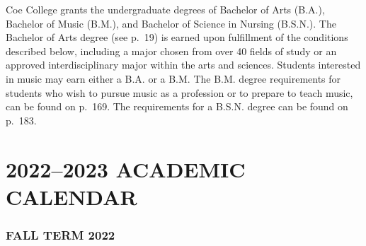 \documentclass[
  letterpaper,
]{scrbook}
\begin{document}
Coe College grants the undergraduate degrees of Bachelor of Arts (B.A.),
Bachelor of Music (B.M.), and Bachelor of Science in Nursing (B.S.N.).
The Bachelor of Arts degree (see p.~19) is earned upon fulfillment of
the conditions described below, including a major chosen from over 40
fields of study or an approved interdisciplinary major within the arts
and sciences. Students interested in music may earn either a B.A. or a
B.M. The B.M. degree requirements for students who wish to pursue music
as a profession or to prepare to teach music, can be found on p.~169.
The requirements for a B.S.N. degree can be found on p.~183.

\hypertarget{academic-calendar}{%
\chapter*{2022--2023 ACADEMIC CALENDAR}\label{academic-calendar}}


\hypertarget{fall-term-2022}{%
\subsection*{FALL TERM 2022}\label{fall-term-2022}}
\end{document}
